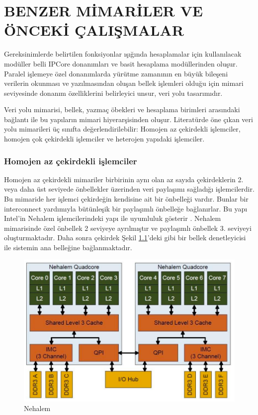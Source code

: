 \chapter{BENZER MİMARİLER VE ÖNCEKİ ÇALIŞMALAR}
Gereksinimlerde belirtilen fonksiyonlar ışığında hesaplamalar için kullanılacak modüller belli IPCore donanımları ve basit hesaplama modüllerinden oluşur. Paralel işlemeye özel donanımlarda yürütme zamanının en büyük bileşeni verilerin okunması ve yazılmasından oluşan bellek işlemleri olduğu için mimari seviyesinde donanım özelliklerini belirleyici unsur, veri yolu tasarımıdır.\par

Veri yolu mimarisi, bellek, yazmaç öbekleri ve hesaplama birimleri arasındaki bağlantı ile bu yapıların mimari hiyerarşisinden oluşur. Literatürde öne çıkan veri yolu mimarileri üç sınıfta değerlendirilebilir: Homojen az çekirdekli işlemciler, homojen çok çekirdekli işlemciler ve heterojen yapıdaki işlemciler. \par

\subsection{Homojen az çekirdekli işlemciler}
Homojen az çekirdekli mimariler birbirinin aynı olan az sayıda çekirdeklerin 2. veya daha üst seviyede önbellekler üzerinden veri paylaşımı sağladığı işlemcilerdir. Bu mimaride her işlemci çekirdeğin kendisine ait bir önbelleği vardır. Bunlar bir interconnect yardımıyla bütünleşik bir paylaşımlı önbelleğe bağlanırlar. Bu yapı Intel'in Nehalem işlemcilerindeki yapı ile uyumluluk gösterir \cite{molka2009memory} \cite{hackenberg2009comparing}. Nehalem mimarisinde özel önbellek 2 seviyeye ayrılmıştır ve paylaşımlı önbellek 3. seviyeyi oluşturmaktadır. Daha sonra çekirdek Şekil \ref{image:nehalem}'deki gibi bir bellek denetleyicisi ile sistemin ana belleğine bağlanmaktadır.\par

\begin{figure}[h] \label{image:nehalem} 
\centering \includegraphics[width=\textwidth]{gorsel/nehalem.jpg} \caption{Nehalem}  
\end{figure}